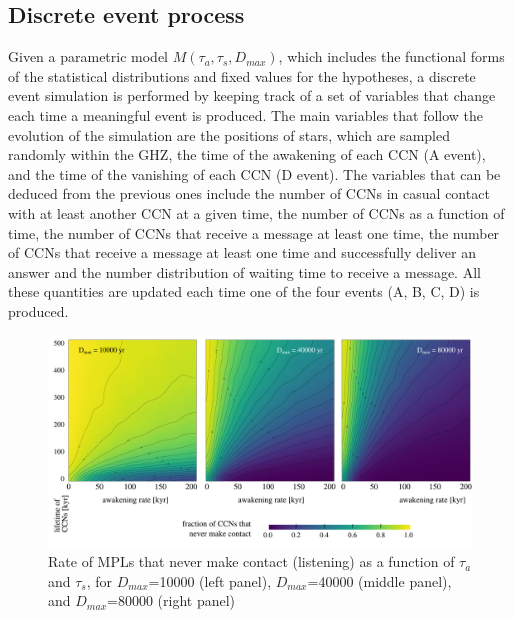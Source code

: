\documentclass[crop]{CSLB}
\newcommand{\ceti}{CCN}
\newcommand{\cetis}{CCNs}
\begin{document}




\subsection{Discrete event process}

Given a parametric model $M(\tau_a, \tau_s, D_{max})$, which includes
the functional forms of the statistical distributions and fixed values
for the hypotheses, a discrete event simulation is performed by
keeping track of a set of variables that change each time a meaningful
event is produced.
%
The main variables that follow the evolution of the simulation are the
positions of stars, which are sampled randomly within the GHZ, the
time of the awakening of each \ceti{} (A event), and the time of the
vanishing of each \ceti{} (D event).
%
The variables that can be deduced from the previous ones include the
number of \cetis{} in casual contact with at least another \ceti{} at a given
time, the number of \cetis{} as a function of time, the number of
\cetis{}
that receive a message at least one time, the number of \cetis{} that
receive a message at least one time and successfully deliver an answer
and the number distribution of waiting time to receive a message.
%
All these quantities are updated each time one of the four events (A,
B, C, D) is produced.
          

           
  
\begin{figure} %
   \centering
   \includegraphics[width=\textwidth]{F_never_contact.pdf}
   \caption{
Rate of MPLs that never make contact (listening) as a
function of $\tau_a$ and $\tau_s$, for 
$D_{max}$=10000 (left panel),
$D_{max}$=40000 (middle panel), and
$D_{max}$=80000 (right panel)
%
   }
   \label{F_never_contact}
\end{figure}
 
\end{document}
